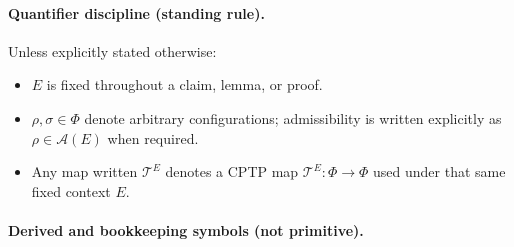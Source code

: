 \documentclass[aps,prx,onecolumn,11pt]{revtex4-2}
\theoremstyle{plain}
\theoremstyle{definition}
\theoremstyle{remark}
\begin{document}
\paragraph{Quantifier discipline (standing rule).}
Unless explicitly stated otherwise:
\begin{itemize}
\item $E$ is fixed throughout a claim, lemma, or proof.
\item $\rho, \sigma \in \Phi$ denote arbitrary configurations;
admissibility is written explicitly as
$\rho \in \mathcal{A}(E)$ when required.
\item Any map written $\mathcal{T}^E$ denotes a CPTP map
$\mathcal{T}^E : \Phi \to \Phi$ used under that same fixed context $E$.
\end{itemize}

\paragraph{Derived and bookkeeping symbols (not primitive).}
\end{document}
